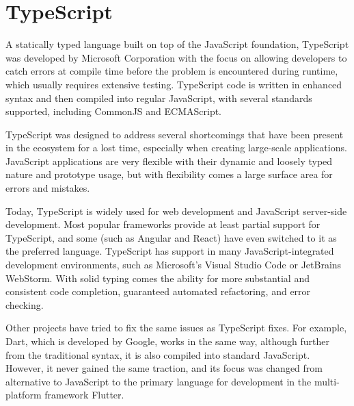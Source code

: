 \section{TypeScript}
A statically typed language built on top of the JavaScript foundation, TypeScript was developed by Microsoft Corporation with the focus on allowing developers to catch errors at compile time before the problem is encountered during runtime, which usually requires extensive testing. TypeScript code is written in enhanced syntax and then compiled into regular JavaScript, with several standards supported, including CommonJS and ECMAScript.\par
TypeScript was designed to address several shortcomings that have been present in the ecosystem for a lost time, especially when creating large-scale applications. JavaScript applications are very flexible with their dynamic and loosely typed nature and prototype usage, but with flexibility comes a large surface area for errors and mistakes. \par
Today, TypeScript is widely used for web development and JavaScript server-side development. Most popular frameworks provide at least partial support for TypeScript, and some (such as Angular and React) have even switched to it as the preferred language. TypeScript has support in many JavaScript-integrated development environments, such as Microsoft's Visual Studio Code or JetBrains WebStorm. With solid typing comes the ability for more substantial and consistent code completion, guaranteed automated refactoring, and error checking.\par
Other projects have tried to fix the same issues as TypeScript fixes. For example, Dart, which is developed by Google, works in the same way, although further from the traditional syntax, it is also compiled into standard JavaScript. However, it never gained the same traction, and its focus was changed from alternative to JavaScript to the primary language for development in the multi-platform framework Flutter.\par

